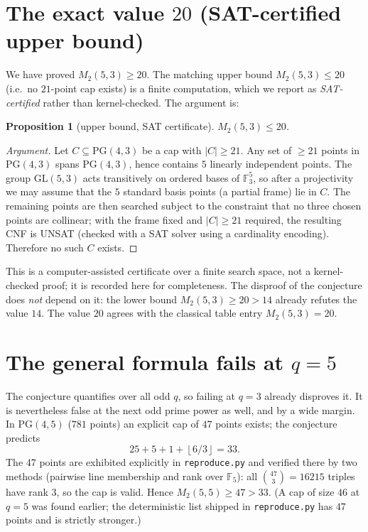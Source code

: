 \documentclass[11pt]{article}
\newtheorem{proposition}[theorem]{Proposition}
\theoremstyle{definition}
\theoremstyle{remark}
\newcommand{\F}{\mathbb{F}}
\newcommand{\PG}{\mathrm{PG}}
\newcommand{\floor}[1]{\left\lfloor #1 \right\rfloor}
\begin{document}
\section{The exact value $20$ (SAT-certified upper bound)}

We have proved $M_{2}(5,3)\ge 20$. The matching upper bound $M_{2}(5,3)\le 20$
(i.e.\ no $21$-point cap exists) is a finite computation, which we report as
\emph{SAT-certified} rather than kernel-checked. The argument is:

\begin{proposition}[upper bound, SAT certificate]
$M_{2}(5,3)\le 20$.
\end{proposition}

\begin{proof}[Argument]
Let $C\subseteq\PG(4,3)$ be a cap with $|C|\ge 21$. Any set of $\ge 21$ points
in $\PG(4,3)$ spans $\PG(4,3)$, hence contains $5$ linearly independent points.
The group $\mathrm{GL}(5,3)$ acts transitively on ordered bases of $\F_{3}^{5}$,
so after a projectivity we may assume that the $5$ standard basis points (a
partial frame) lie in $C$. The remaining points are then searched subject to the
constraint that no three chosen points are collinear; with the frame fixed and
$|C|\ge 21$ required, the resulting CNF is UNSAT (checked with a SAT solver
using a cardinality encoding). Therefore no such $C$ exists.
\end{proof}

This is a computer-assisted certificate over a finite search space, not a
kernel-checked proof; it is recorded here for completeness. The disproof of the
conjecture does \emph{not} depend on it: the lower bound $M_{2}(5,3)\ge 20>14$
already refutes the value $14$. The value $20$ agrees with the classical table
entry $M_{2}(5,3)=20$.

\section{The general formula fails at $q=5$}

The conjecture quantifies over all odd $q$, so failing at $q=3$ already
disproves it. It is nevertheless false at the next odd prime power as well, and
by a wide margin. In $\PG(4,5)$ ($781$ points) an explicit cap of $47$ points
exists; the conjecture predicts
\[
25+5+1+\floor{6/3}=33 .
\]
The $47$ points are exhibited explicitly in \texttt{reproduce.py} and verified
there by two methods (pairwise line membership and rank over $\F_{5}$): all
$\binom{47}{3}=16215$ triples have rank $3$, so the cap is valid. Hence
$M_{2}(5,5)\ge 47>33$. (A cap of size $46$ at $q=5$ was found earlier; the
deterministic list shipped in \texttt{reproduce.py} has $47$ points and is
strictly stronger.)
\end{document}
